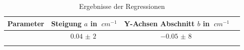 \begin{table}[h!]
    \begin{center}
        \caption{Ergebnisse der Regressionen}
        \begin{tabular}{cccc}
            \hline
            Parameter & Steigung $a$ in $\SI{}{cm^{-1}}$   & Y-Achsen Abschnitt $b$ in $\SI{}{cm^{-1}}$\\
            \hline
                     & $\SI{0,04(2)}{}$   & $\SI{-0,05(8)}{}$ \\
            \hline
            \label{tab:abbe-Regression-results}
        \end{tabular}
    \end{center}
\end{table}
